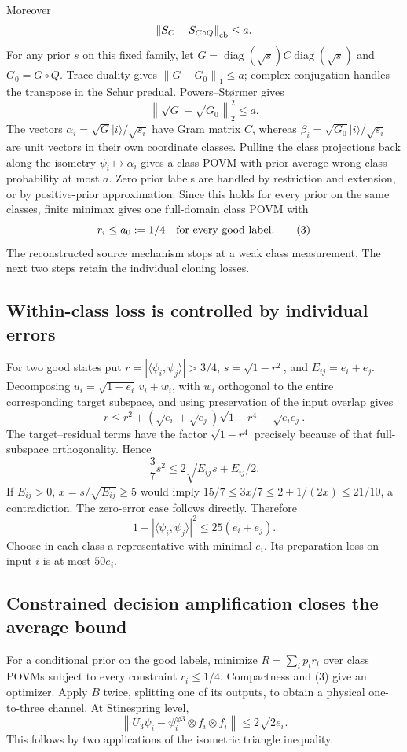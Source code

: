 \documentclass[11pt]{article}
\newcommand{\norm}[1]{\left\lVert#1\right\rVert}
\begin{document}
Moreover
\[
\norm{S_C-S_{C\circ Q}}_{\rm cb}\le a.
\]
For any prior $s$ on this fixed family, let $G=\operatorname{diag}(\sqrt s)C\operatorname{diag}(\sqrt s)$ and $G_0=G\circ Q$. Trace duality gives $\norm{G-G_0}_1\le a$; complex conjugation handles the transpose in the Schur predual. Powers--St\o rmer gives
\[
\norm{\sqrt G-\sqrt{G_0}}_2^2\le a.
\]
The vectors $\alpha_i=\sqrt G|i\rangle/\sqrt{s_i}$ have Gram matrix $C$, whereas $\beta_i=\sqrt{G_0}|i\rangle/\sqrt{s_i}$ are unit vectors in their own coordinate classes. Pulling the class projections back along the isometry $\psi_i\mapsto\alpha_i$ gives a class POVM with prior-average wrong-class probability at most $a$. Zero prior labels are handled by restriction and extension, or by positive-prior approximation. Since this holds for every prior on the same classes, finite minimax gives one full-domain class POVM with
\[
r_i\le a_0:=1/4\quad\hbox{for every good label.}\tag{3}
\]
The reconstructed source mechanism stops at a weak class measurement. The next two steps retain the individual cloning losses.

\subsection{Within-class loss is controlled by individual errors}

For two good states put $r=|\langle\psi_i,\psi_j\rangle|>3/4$, $s=\sqrt{1-r^2}$, and $E_{ij}=e_i+e_j$. Decomposing $u_i=\sqrt{1-e_i}\,v_i+w_i$, with $w_i$ orthogonal to the entire corresponding target subspace, and using preservation of the input overlap gives
\[
r\le r^2+(\sqrt{e_i}+\sqrt{e_j})\sqrt{1-r^4}+\sqrt{e_i e_j}.
\]
The target--residual terms have the factor $\sqrt{1-r^4}$ precisely because of that full-subspace orthogonality. Hence
\[
\frac37s^2\le2\sqrt{E_{ij}}s+E_{ij}/2.
\]
If $E_{ij}>0$, $x=s/\sqrt{E_{ij}}\ge5$ would imply
$15/7\le3x/7\le2+1/(2x)\le21/10$, a contradiction. The zero-error case follows directly. Therefore
\[
1-|\langle\psi_i,\psi_j\rangle|^2\le25(e_i+e_j).\tag{4}
\]
Choose in each class a representative with minimal $e_i$. Its preparation loss on input $i$ is at most $50e_i$.

\subsection{Constrained decision amplification closes the average bound}

For a conditional prior on the good labels, minimize $R=\sum_i p_i r_i$ over class POVMs subject to every constraint $r_i\le1/4$. Compactness and (3) give an optimizer. Apply $B$ twice, splitting one of its outputs, to obtain a physical one-to-three channel. At Stinespring level,
\[
\norm{U_3\psi_i-\psi_i^{\otimes3}\otimes f_i\otimes f_i}
\le2\sqrt{2e_i}.\tag{5}
\]
This follows by two applications of the isometric triangle inequality.
\end{document}

